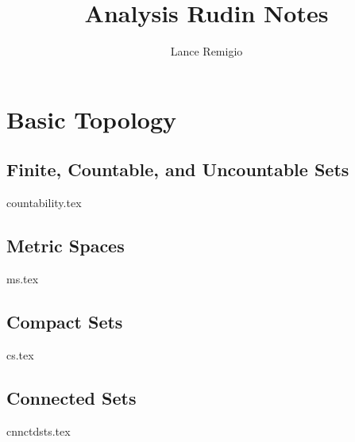 \documentclass[11pt,a4paper]{book}
\title{Analysis Rudin Notes}
\author{Lance Remigio}
\begin{document}
\maketitle
\tableofcontents
\listoftheorems[ignoreall,show={theorem,defn}]

\chapter{Basic Topology}


\section{Finite, Countable, and Uncountable Sets}

{countability.tex}

\section{Metric Spaces}

{ms.tex}

\section{Compact Sets}

{cs.tex}

\section{Connected Sets}

{cnnctdsts.tex}
\end{document}
